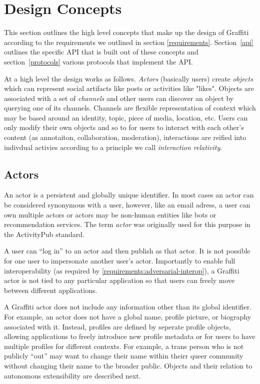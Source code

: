 \section{Design Concepts}

This section outlines the high level concepts that make up the design of Graffiti
according to the requirements we outlined in section \ref{requirements}.
Section~\ref{api} outlines the specific API that is built out of these
concepts and section~\ref{protocols} various protocols that implement the API.

At a high level the design works as follows.
\emph{Actors} (basically users) create \emph{objects} which can represent
social artifacts like posts or activities like "likes".
Objects are associated with a set of \emph{channels} and other users can
discover an object by querying one of its channels. Channels are flexible representation
of context which may be based around an identity, topic, piece of media, location, etc.
Users can only modify their own objects and so to for users to interact with each other's content
(as annotaiton, collaboration, moderation), interactions are reified into indivdual
activies according to a principle we call \emph{interaction relativity}.

\subsection{Actors}

An actor is a persistent and globally unique identifier.
In most cases an actor can be considered synonymous with a user,
however, like an email adress, a user can own multiple actors
or actors may be non-human entities like bots or recommendation services.
The term \emph{actor} was originally used for this purpose
in the ActivityPub standard.

A user can ``log in'' to an actor and then publish as that actor.
It is not possible for one user to impersonate another user's actor.
Importantly to enable full interoperability
(as required by \ref{requirements:adversarial-interop}),
a Graffiti actor is not tied to any particular application so that users can freely move between
different applications.

A Graffiti actor does not include any information other than its
global identifier. For example, an actor does not have a global
name, profile picture, or biography associated with it.
Instead, profiles are defined by seperate profile objects,
allowing applications to freely introduce new profile
metadata or for users to have multiple profiles for different contexts.
For example, a trans person who is not publicly ``out'' may want to
change their name within theirr queer community without
changing their name to the broader public.
Objects and their relation to autonomous extensibility are described next.

